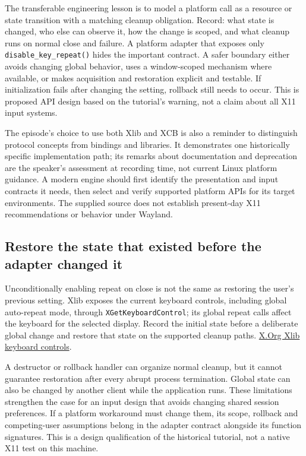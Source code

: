 The transferable engineering lesson is to model a platform call as a resource or state transition with a matching cleanup obligation. Record: what state is changed, who else can observe it, how the change is scoped, and what cleanup runs on normal close and failure. A platform adapter that exposes only \texttt{disable\_key\_repeat()} hides the important contract. A safer boundary either avoids changing global behavior, uses a window-scoped mechanism where available, or makes acquisition and restoration explicit and testable. If initialization fails after changing the setting, rollback still needs to occur. This is proposed API design based on the tutorial's warning, not a claim about all X11 input systems.

The episode's choice to use both Xlib and XCB is also a reminder to distinguish protocol concepts from bindings and libraries. It demonstrates one historically specific implementation path; its remarks about documentation and deprecation are the speaker's assessment at recording time, not current Linux platform guidance. A modern engine should first identify the presentation and input contracts it needs, then select and verify supported platform APIs for its target environments. The supplied source does not establish present-day X11 recommendations or behavior under Wayland.

\subsection{Restore the state that existed before the adapter changed it}\label{01-foundations-i-ch016-restore-the-state-that-existed-before-the-adapter-changed-it}

Unconditionally enabling repeat on close is not the same as restoring the user's previous setting. Xlib exposes the current keyboard controls, including global auto-repeat mode, through \texttt{XGetKeyboardControl}; its global repeat calls affect the keyboard for the selected display. Record the initial state before a deliberate global change and restore that state on the supported cleanup paths. \href{https://www.x.org/releases/X11R7.6/doc/libX11/specs/libX11/libX11.html}{X.Org Xlib keyboard controls}.

A destructor or rollback handler can organize normal cleanup, but it cannot guarantee restoration after every abrupt process termination. Global state can also be changed by another client while the application runs. These limitations strengthen the case for an input design that avoids changing shared session preferences. If a platform workaround must change them, its scope, rollback and competing-user assumptions belong in the adapter contract alongside its function signatures. This is a design qualification of the historical tutorial, not a native X11 test on this machine.

